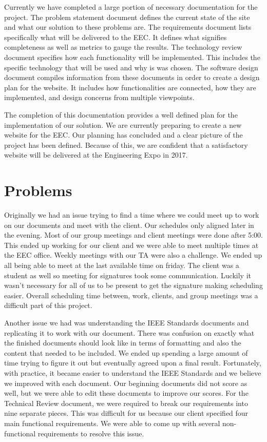 \documentclass[letterpaper,10pt,titlepage,journal,compsoc,draftclsnofoot,onecolumn]{IEEEtran}
\newcommand\tab[1][1cm]{\hspace*{#1}}
\begin{document}
\tab Currently we have completed a large portion of necessary documentation for the project. The problem statement document defines the current state of the site and what our solution to these problems are. The requirements document lists specifically what will be delivered to the EEC. It defines what signifies completeness as well as metrics to gauge the results. The technology review document specifies how each functionality will be implemented. This includes the specific technology that will be used and why is was chosen. The software design document compiles information from these documents in order to create a design plan for the website. It includes how functionalities are connected, how they are implemented, and design concerns from multiple viewpoints.\newline

\tab The completion of this documentation provides a well defined plan for the implementation of our solution. We are currently preparing to create a new website for the EEC. Our planning has concluded and a clear picture of the project has been defined. Because of this, we are confident that a satisfactory website will be delivered at the Engineering Expo in 2017. 

\section{Problems}

\tab Originally we had an issue trying to find a time where we could meet up to work on our documents and meet with the client. Our schedules only aligned later in the evening. Most of our group meetings and client meetings were done after 5:00. This ended up working for our client and we were able to meet multiple times at the EEC office. Weekly meetings with our TA were also a challenge. We ended up all being able to meet at the last available time on friday. The client was a student as well so meeting for signatures took some communication. Luckily it wasn’t necessary for all of us to be present to get the signature making scheduling easier. Overall scheduling time between, work, clients, and group meetings was a difficult part of this project.\newline

\tab Another issue we had was understanding the IEEE Standards documents and replicating it to work with our document. There was confusion on exactly what the finished documents should look like in terms of formatting and also the content that needed to be included. We ended up spending a large amount of time trying to figure it out but eventually agreed upon a final result. Fortunately, with practice, it became easier to understand the IEEE Standards and we believe we improved with each document. Our beginning documents did not score as well, but we were able to edit these documents to improve our scores. For the Technical Review document, we were required to break our requirements into nine separate pieces. This was difficult for us because our client specified four main functional requirements. We were able to come up with several non-functional requirements to resolve this issue.
\end{document}
